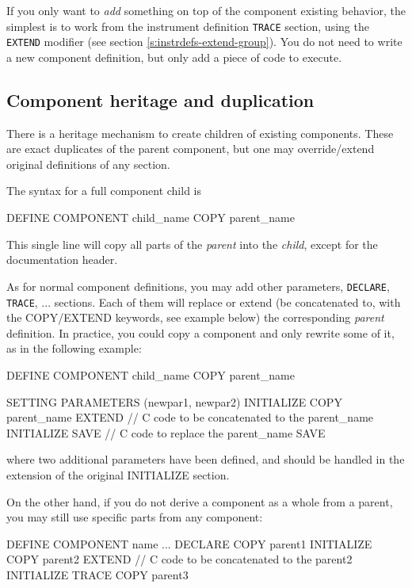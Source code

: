 If you only want to \emph{add} something on top of the component existing behavior, the simplest is to work from the instrument definition \texttt{TRACE} section, using the \texttt{EXTEND} modifier (see section \ref{s:instrdefs-extend-group}). You do not need to write a new component definition, but only add a piece of code to execute.

\subsection{Component heritage and duplication}

There is a heritage mechanism to create children of existing components. These
are exact duplicates of the parent component, but one may override/extend
original definitions of any section.

The syntax for a full component child is
\begin{mcstas}
DEFINE COMPONENT child_name COPY parent_name
\end{mcstas}

This single line will copy all parts of the \textit{parent} into the \textit{child}, except for the documentation header.

As for normal component definitions, you may add other parameters,
\texttt{DECLARE}, \texttt{TRACE}, ... sections. Each of them will replace or
extend (be concatenated to, with the COPY/EXTEND keywords, see example below)
the corresponding \textit{parent} definition. In practice, you could copy a
component and only rewrite some of it, as in the following example:

\begin{mcstas}
DEFINE COMPONENT  child_name COPY parent_name

  SETTING PARAMETERS (newpar1, newpar2) 
  INITIALIZE COPY  parent_name EXTEND 
// C code to be concatenated to the  parent_name INITIALIZE
  SAVE
// C code to replace the  parent_name SAVE 
\end{mcstas}
where two additional parameters have been defined, and should be handled in the
extension of the original INITIALIZE section.

On the other hand, if you do not derive a component as a whole from a parent,
you may still use specific parts from any component:
\begin{mcstas}
DEFINE COMPONENT  name ...
  DECLARE COPY  parent1 
  INITIALIZE COPY  parent2 EXTEND 
// C code to be concatenated to the  parent2 INITIALIZE
TRACE COPY  parent3
\end{mcstas}


